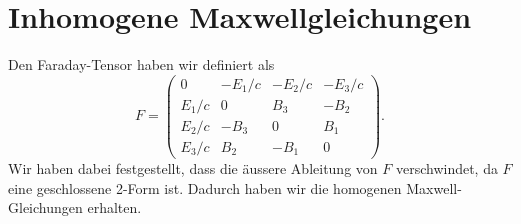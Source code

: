 %
%
%
%
\section{Inhomogene Maxwellgleichungen
	\label{maxwell:section:InhomogeneMaxwellgleichungen}}
Den Faraday-Tensor haben wir definiert als
\begin{equation}
	F = \begin{pmatrix}
		0 & -E_1/c & -E_2/c & -E_3/c \\ E_1/c & 0 & B_3 & -B_2 \\ E_2/c & -B_3 & 0 & B_1 \\ E_3/c & B_2 & -B_1 & 0 
	\end{pmatrix}.
\end{equation}
Wir haben dabei festgestellt, dass die äussere Ableitung von $F$ verschwindet, da $F$ eine geschlossene 2-Form ist. Dadurch haben wir die homogenen Maxwell-Gleichungen erhalten. 

